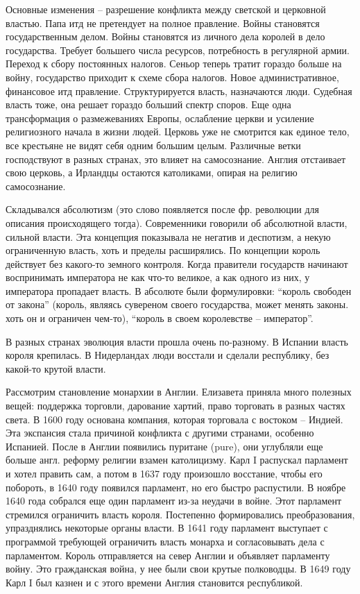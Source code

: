 \documentclass[a4paper, 12pt]{article}
\begin{document}
\begin{multicols}{2}
Основные изменения -- разрешение конфликта между светской и церковной властью. Папа итд не претендует на полное правление. Войны становятся государственным делом. Войны становятся из личного дела королей в дело государства. Требует большего числа ресурсов, потребность в регулярной армии. Переход к сбору постоянных налогов. Сеньор теперь тратит гораздо больше на войну, государство приходит к схеме сбора налогов. Новое административное, финансовое итд правление. Структурируется власть, назначаются люди. Судебная власть тоже, она решает гораздо больший спектр споров. Еще одна трансформация о размежеваниях Европы, ослабление церкви и усиление религиозного начала в жизни людей. Церковь уже не смотрится как единое тело, все крестьяне не видят себя одним большим целым. Различные ветки господствуют в разных странах, это влияет на самосознание. Англия отстаивает свою церковь, а Ирландцы остаются католиками, опирая на религию самосознание. 

Складывался абсолютизм (это слово появляется после фр. революции для описания происходящего тогда). Современники говорили об абсолютной власти, сильной власти. Эта концепция показывала не негатив и деспотизм, а некую ограниченную власть, хоть и пределы расширялись. По концепции король действует без какого-то земного контроля. Когда правители государств начинают воспринимать императора не как что-то великое, а как одного из них, у императора пропадает власть. В абсолюте были формулировки: ``король свободен от закона'' (король, являясь сувереном своего государства, может менять законы. хоть он и ограничен чем-то), ``король в своем королевстве -- император''. 

В разных странах эволюция власти прошла очень по-разному. В Испании власть короля крепилась. В Нидерландах люди восстали и сделали республику, без какой-то крутой власти. 

Рассмотрим становление монархии в Англии. Елизавета приняла много полезных вещей: поддержка торговли, дарование хартий, право торговать в разных частях света. В 1600 году основана компания, которая торговала с востоком -- Индией. Эта экспансия стала причиной конфликта с другими странами, особенно Испанией. После в Англии появились пуритане (pure), они углубляли еще больше англ. реформу религии взамен католицизму. Карл I распускал парламент и хотел править сам, а потом в 1637 году произошло восстание, чтобы его побороть, в 1640 году появился парламент, но его быстро распустили. В ноябре 1640 года собрался еще один парламент из-за неудачи в войне. Этот парламент стремился ограничить власть короля. Постепенно формировались преобразования, упразднялись некоторые органы власти. В 1641 году парламент выступает с программой требующей ограничить власть монарха и согласовывать дела с парламентом. Король отправляется на север Англии и объявляет парламенту войну. Это гражданская война, у нее были свои крутые полководцы. В 1649 году Карл I был казнен и с этого времени Англия становится республикой. 


\end{multicols}
\end{document}
